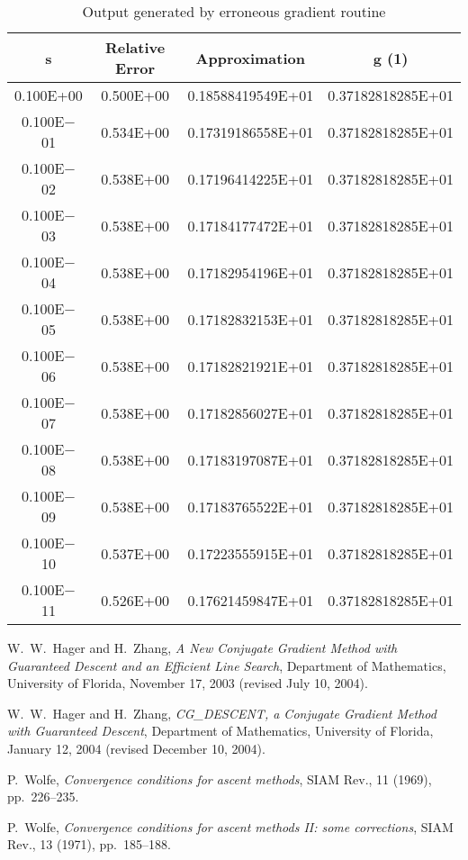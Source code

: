 \documentclass [12pt] {article}
\begin{document}
\begin{table}
\begin{center}
\begin{tabular}{cccc}
{\sc s} & Relative Error & Approximation & {\sc g} (1) \\
\hline
0.100E+00& 0.500E+00 & 0.18588419549E+01 & 0.37182818285E+01 \\
0.100E$-$01& 0.534E+00 & 0.17319186558E+01 & 0.37182818285E+01 \\
0.100E$-$02& 0.538E+00 & 0.17196414225E+01 & 0.37182818285E+01 \\
0.100E$-$03& 0.538E+00 & 0.17184177472E+01 & 0.37182818285E+01 \\
0.100E$-$04& 0.538E+00 & 0.17182954196E+01 & 0.37182818285E+01 \\
0.100E$-$05& 0.538E+00 & 0.17182832153E+01 & 0.37182818285E+01 \\
0.100E$-$06& 0.538E+00 & 0.17182821921E+01 & 0.37182818285E+01 \\
0.100E$-$07& 0.538E+00 & 0.17182856027E+01 & 0.37182818285E+01 \\
0.100E$-$08& 0.538E+00 & 0.17183197087E+01 & 0.37182818285E+01 \\
0.100E$-$09& 0.538E+00 & 0.17183765522E+01 & 0.37182818285E+01 \\
0.100E$-$10& 0.537E+00 & 0.17223555915E+01 & 0.37182818285E+01 \\
0.100E$-$11& 0.526E+00 & 0.17621459847E+01 & 0.37182818285E+01 \\
\hline
\end{tabular}
\end{center}
\caption{Output generated by erroneous gradient routine}
\label{out2}
\end{table}
\begin{thebibliography}{99}
{\sc W.\ W.\ Hager and H.\ Zhang,}
{\it A New Conjugate Gradient Method with
Guaranteed Descent and an Efficient Line Search},
Department of Mathematics, University of Florida, November 17, 2003
(revised July 10, 2004).

{\sc W.\ W.\ Hager and H.\ Zhang,}
{\it CG\_DESCENT, a Conjugate Gradient Method
with Guaranteed Descent},
Department of Mathematics, University of Florida, January 12, 2004
(revised December 10, 2004).


{\sc P.\ Wolfe},
{\it Convergence conditions for ascent methods},
SIAM Rev., 11 (1969), pp.\ 226--235.

{\sc P.\ Wolfe},
{\it Convergence conditions for ascent methods II: some corrections},
SIAM Rev., 13 (1971), pp.\ 185--188.

\end {thebibliography}
\end{document}
